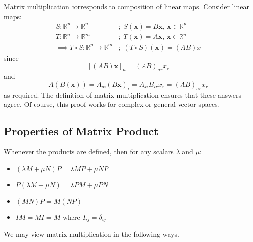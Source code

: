 \documentclass{article}
\begin{document}
	Matrix multiplication corresponds to composition of linear maps. Consider linear maps:
	\begin{align*}
		S: \mathbb R^p \to \mathbb R^n&;\; S(\bm x) = B \bm x,\, \bm x \in \mathbb R^p \\
		T: \mathbb R^n \to \mathbb R^m&;\; T(\bm x) = A \bm x,\, \bm x \in \mathbb R^n \\
		\implies T \circ S: \mathbb R^p \to \mathbb R^m&;\; (T\circ S)(\bm x) = (AB)x
	\end{align*}
	since
	\[ \left[ (AB)\bm x \right]_a = (AB)_{ar}x_r \]
	and
	\[ A(B(\bm x)) = A_{ai} (B\bm x)_i = A_{ai} B_{ir} x_r = (AB)_{ar}x_r \]
	as required. The definition of matrix multiplication ensures that these answers agree. Of course, this proof works for complex or general vector spaces.

	\subsection{Properties of Matrix Product}
	Whenever the products are defined, then for any scalars $\lambda$ and $\mu$:
	\begin{itemize}
		\item $(\lambda M + \mu N)P = \lambda MP + \mu NP$
		\item $P(\lambda M + \mu N) = \lambda PM + \mu PN$
		\item $(MN)P = M(NP)$
		\item $IM = MI = M$ where $I_{ij} = \delta_{ij}$
	\end{itemize}
	We may view matrix multiplication in the following ways.
\end{document}
